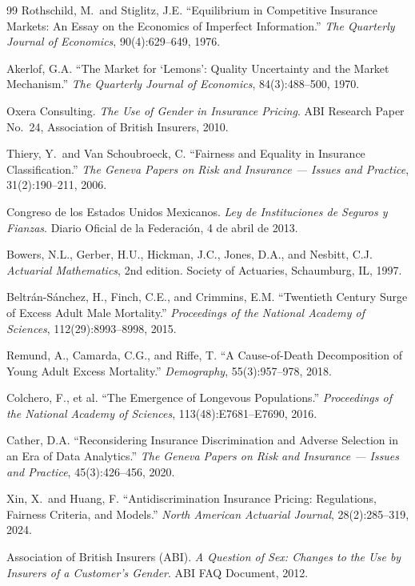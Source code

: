 \documentclass[12pt,a4paper]{article}
\begin{document}
\begin{thebibliography}{99}
Rothschild, M.\ and Stiglitz, J.E.
``Equilibrium in Competitive Insurance Markets: An Essay on the Economics of
Imperfect Information.''
\emph{The Quarterly Journal of Economics}, 90(4):629--649, 1976.

Akerlof, G.A.
``The Market for `Lemons': Quality Uncertainty and the Market Mechanism.''
\emph{The Quarterly Journal of Economics}, 84(3):488--500, 1970.

Oxera Consulting.
\emph{The Use of Gender in Insurance Pricing}.
ABI Research Paper No.\ 24, Association of British Insurers, 2010.

Thiery, Y.\ and Van Schoubroeck, C.
``Fairness and Equality in Insurance Classification.''
\emph{The Geneva Papers on Risk and Insurance --- Issues and Practice}, 31(2):190--211, 2006.

Congreso de los Estados Unidos Mexicanos.
\emph{Ley de Instituciones de Seguros y Fianzas}.
Diario Oficial de la Federaci\'{o}n, 4 de abril de 2013.

Bowers, N.L., Gerber, H.U., Hickman, J.C., Jones, D.A., and Nesbitt, C.J.
\emph{Actuarial Mathematics}, 2nd edition.
Society of Actuaries, Schaumburg, IL, 1997.

Beltr\'{a}n-S\'{a}nchez, H., Finch, C.E., and Crimmins, E.M.
``Twentieth Century Surge of Excess Adult Male Mortality.''
\emph{Proceedings of the National Academy of Sciences}, 112(29):8993--8998, 2015.

Remund, A., Camarda, C.G., and Riffe, T.
``A Cause-of-Death Decomposition of Young Adult Excess Mortality.''
\emph{Demography}, 55(3):957--978, 2018.

Colchero, F., et al.
``The Emergence of Longevous Populations.''
\emph{Proceedings of the National Academy of Sciences}, 113(48):E7681--E7690, 2016.

Cather, D.A.
``Reconsidering Insurance Discrimination and Adverse Selection in an Era of Data Analytics.''
\emph{The Geneva Papers on Risk and Insurance --- Issues and Practice}, 45(3):426--456, 2020.

Xin, X.\ and Huang, F.
``Antidiscrimination Insurance Pricing: Regulations, Fairness Criteria, and Models.''
\emph{North American Actuarial Journal}, 28(2):285--319, 2024.

Association of British Insurers (ABI).
\emph{A Question of Sex: Changes to the Use by Insurers of a Customer's Gender}.
ABI FAQ Document, 2012.

\end{thebibliography}
\end{document}
